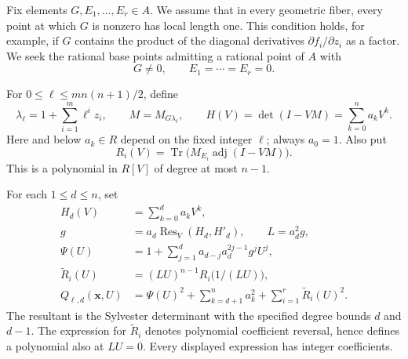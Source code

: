\documentclass[11pt,a4paper]{article}
\theoremstyle{definition}
\theoremstyle{remark}
\begin{document}
Fix elements $G,E_1,\ldots,E_r\in A$. We assume that in every geometric
fiber, every point at which $G$ is nonzero has local length one. This
condition holds, for example, if $G$ contains the product of the diagonal
derivatives $\partial f_i/\partial z_i$ as a factor. We seek the rational
base points admitting a rational point of $A$ with
\[
 G\ne0,\qquad E_1=\cdots=E_r=0.
\]

For $0\le\ell\le m n(n+1)/2$, define
\[
 \lambda_\ell=1+\sum_{i=1}^m\ell^i z_i,\qquad
 M=M_{G\lambda_\ell},\qquad
 H(V)=\det(I-VM)=\sum_{k=0}^n a_kV^k.
\]
Here and below $a_k\in R$ depend on the fixed integer $\ell$; always
$a_0=1$. Also put
\[
 R_i(V)=\operatorname{Tr}\bigl(M_{E_i}\operatorname{adj}(I-VM)\bigr).
\]
This is a polynomial in $R[V]$ of degree at most $n-1$.

For each $1\le d\le n$, set
\begin{align*}
 H_d(V)&=\sum_{k=0}^d a_kV^k,\\
 g&=a_d\operatorname{Res}_{V}(H_d,H'_d),\qquad L=a_d^2g,\\
 \Psi(U)&=1+\sum_{j=1}^d a_{d-j}a_d^{2j-1}g^jU^j,\\
 \widetilde R_i(U)&=(LU)^{n-1}R_i\bigl(1/(LU)\bigr),\\
 Q_{\ell,d}(\mathbf x,U)&=
 \Psi(U)^2+\sum_{k=d+1}^n a_k^2+\sum_{i=1}^r\widetilde R_i(U)^2.
\end{align*}
The resultant is the Sylvester determinant with the specified degree
bounds $d$ and $d-1$. The expression for $\widetilde R_i$ denotes
polynomial coefficient reversal, hence defines a polynomial also at
$LU=0$. Every displayed expression has integer coefficients.
\end{document}
